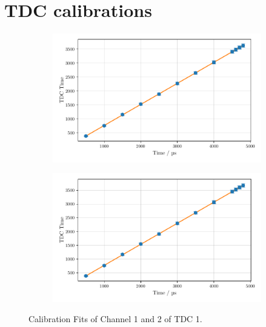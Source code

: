 \chapter{TDC calibrations}
\begin{figure}
    \centering
    \begin{subfigure}[b]{0.48\textwidth}
        \includegraphics[width=\textwidth]{plots/tdc0.pdf}
    \end{subfigure}\hfill
    \begin{subfigure}[b]{0.48\textwidth}
        \includegraphics[width=\textwidth]{plots/tdc1.pdf}
    \end{subfigure}
    \caption{Calibration Fits of Channel 1 and 2 of TDC 1.}
    \label{fig:tdc01}
\end{figure}
